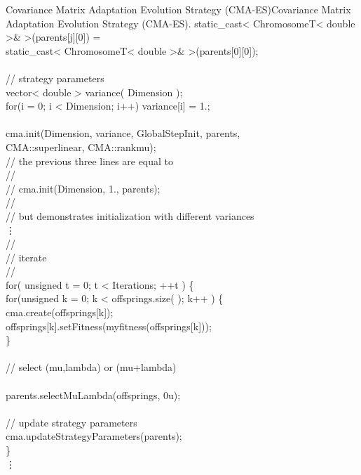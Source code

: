 \begin{programlisting}{Covariance Matrix Adaptation  Evolution Strategy (CMA-ES)}{Covariance Matrix Adaptation  Evolution Strategy (CMA-ES).}
  static_cast< ChromosomeT< double >\& >(parents[j][0]) =\\
    static_cast< ChromosomeT< double >\& >(parents[0][0]);\\
\\
// strategy parameters\\
vector< double > variance( Dimension );\\
for(i = 0; i < Dimension; i++) variance[i] = 1.;\\
\\
cma.init(Dimension, variance, GlobalStepInit, parents,\\
         CMA::superlinear, CMA::rankmu); \\
// the previous three lines are equal to \\
//\\
// cma.init(Dimension, 1., parents);\\
//\\
// but demonstrates initialization with different variances\\
    \vdots\\
//\\
// iterate\\
//\\
for( unsigned t = 0; t < Iterations; ++t ) \{\\
  for(unsigned k = 0; k < offsprings.size( ); k++ ) \{\\
    cma.create(offsprings[k]);\\
    offsprings[k].setFitness(myfitness(offsprings[k]));\\
  \}\\
\\
  // select (mu,lambda) or (mu+lambda)\\
\\
  parents.selectMuLambda(offsprings, 0u);\\
\\
  // update strategy parameters\\
  cma.updateStrategyParameters(parents);\\
\}\\
    \vdots\\
\end{programlisting}








